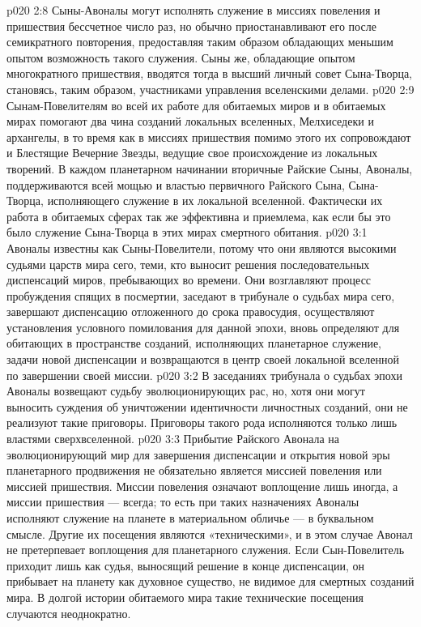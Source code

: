 \vs p020 2:8 \pc Сыны\hyp{}Авоналы могут исполнять служение в миссиях повеления и пришествия бессчетное число раз, но обычно приостанавливают его после семикратного повторения, предоставляя таким образом обладающих меньшим опытом возможность такого служения. Сыны же, обладающие опытом многократного пришествия, вводятся тогда в высший личный совет Сына\hyp{}Творца, становясь, таким образом, участниками управления вселенскими делами.
\vs p020 2:9 Сынам\hyp{}Повелителям во всей их работе для обитаемых миров и в обитаемых мирах помогают два чина созданий локальных вселенных, Мелхиседеки и архангелы, в то время как в миссиях пришествия помимо этого их сопровождают и Блестящие Вечерние Звезды, ведущие свое происхождение из локальных творений. В каждом планетарном начинании вторичные Райские Сыны, Авоналы, поддерживаются всей мощью и властью первичного Райского Сына, Сына\hyp{}Творца, исполняющего служение в их локальной вселенной. Фактически их работа в обитаемых сферах так же эффективна и приемлема, как если бы это было служение Сына\hyp{}Творца в этих мирах смертного обитания.
\vs p020 3:1 Авоналы известны как Сыны\hyp{}Повелители, потому что они являются высокими судьями царств мира сего, теми, кто выносит решения последовательных диспенсаций миров, пребывающих во времени. Они возглавляют процесс пробуждения спящих в посмертии, заседают в трибунале о судьбах мира сего, завершают диспенсацию отложенного до срока правосудия, осуществляют установления условного помилования для данной эпохи, вновь определяют для обитающих в пространстве созданий, исполняющих планетарное служение, задачи новой диспенсации и возвращаются в центр своей локальной вселенной по завершении своей миссии.
\vs p020 3:2 В заседаниях трибунала о судьбах эпохи Авоналы возвещают судьбу эволюционирующих рас, но, хотя они могут выносить суждения об уничтожении идентичности личностных созданий, они не реализуют такие приговоры. Приговоры такого рода исполняются только лишь властями сверхвселенной.
\vs p020 3:3 Прибытие Райского Авонала на эволюционирующий мир для завершения диспенсации и открытия новой эры планетарного продвижения не обязательно является миссией повеления или миссией пришествия. Миссии повеления означают воплощение лишь иногда, а миссии пришествия --- всегда; то есть при таких назначениях Авоналы исполняют служение на планете в материальном обличье --- в буквальном смысле. Другие их посещения являются «техническими», и в этом случае Авонал не претерпевает воплощения для планетарного служения. Если Сын\hyp{}Повелитель приходит лишь как судья, выносящий решение в конце диспенсации, он прибывает на планету как духовное существо, не видимое для смертных созданий мира. В долгой истории обитаемого мира такие технические посещения случаются неоднократно.
